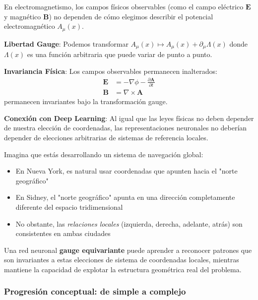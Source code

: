 \begin{example}
En electromagnetismo, los campos físicos observables (como el campo eléctrico $\mathbf{E}$ y magnético $\mathbf{B}$) no dependen de cómo elegimos describir el potencial electromagnético $A_\mu(x)$. 

\textbf{Libertad Gauge}: Podemos transformar $A_\mu(x) \mapsto A_\mu(x) + \partial_\mu \Lambda(x)$ donde $\Lambda(x)$ es una función arbitraria que puede variar de punto a punto.

\textbf{Invariancia Física}: Los campos observables permanecen inalterados:
\begin{align}
\mathbf{E} &= -\nabla \phi - \frac{\partial \mathbf{A}}{\partial t} \\
\mathbf{B} &= \nabla \times \mathbf{A}
\end{align}
permanecen invariantes bajo la transformación gauge.

\textbf{Conexión con Deep Learning}: Al igual que las leyes físicas no deben depender de nuestra elección de coordenadas, las representaciones neuronales no deberían depender de elecciones arbitrarias de sistemas de referencia locales.
\end{example}

\begin{example}
Imagina que estás desarrollando un sistema de navegación global:
\begin{itemize}
    \item En Nueva York, es natural usar coordenadas que apunten hacia el "norte geográfico"
    \item En Sidney, el "norte geográfico" apunta en una dirección completamente diferente del espacio tridimensional
    \item No obstante, las \textit{relaciones locales} (izquierda, derecha, adelante, atrás) son consistentes en ambas ciudades
\end{itemize}

Una red neuronal \textbf{gauge equivariante} puede aprender a reconocer patrones que son invariantes a estas elecciones de sistema de coordenadas locales, mientras mantiene la capacidad de explotar la estructura geométrica real del problema.
\end{example}

\subsubsection{Progresión conceptual: de simple a complejo}

